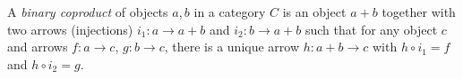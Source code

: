 A \emph{binary coproduct} of objects $a, b$ in a category $C$ is an object $a + b$ together with two arrows (injections) $i_1: a \to a + b$ and $i_2: b \to a + b$ such that for any object $c$ and arrows $f: a \to c$, $g: b \to c$, there is a unique arrow $h: a + b \to c$ with $h \circ i_1 = f$ and $h \circ i_2 = g$.
